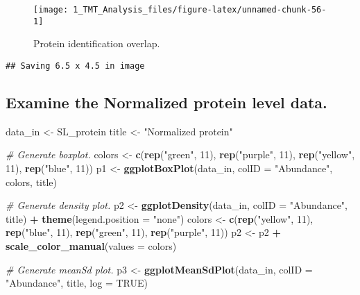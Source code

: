 \documentclass[]{article}
\newenvironment{Shaded}{\begin{snugshade}}{\end{snugshade}}
\newcommand{\KeywordTok}[1]{\textcolor[rgb]{0.13,0.29,0.53}{\textbf{#1}}}
\newcommand{\DataTypeTok}[1]{\textcolor[rgb]{0.13,0.29,0.53}{#1}}
\newcommand{\DecValTok}[1]{\textcolor[rgb]{0.00,0.00,0.81}{#1}}
\newcommand{\StringTok}[1]{\textcolor[rgb]{0.31,0.60,0.02}{#1}}
\newcommand{\CommentTok}[1]{\textcolor[rgb]{0.56,0.35,0.01}{\textit{#1}}}
\newcommand{\OtherTok}[1]{\textcolor[rgb]{0.56,0.35,0.01}{#1}}
\newcommand{\OperatorTok}[1]{\textcolor[rgb]{0.81,0.36,0.00}{\textbf{#1}}}
\newcommand{\NormalTok}[1]{#1}
\begin{document}
\begin{figure}

{\centering \texttt{[image: 1\_TMT\_Analysis\_files/figure-latex/unnamed-chunk-56-1]} 

}

\caption{Protein identification overlap.}\label{fig:unnamed-chunk-56}
\end{figure}

\begin{verbatim}
## Saving 6.5 x 4.5 in image
\end{verbatim}

\subsection{Examine the Normalized protein level
data.}\label{examine-the-normalized-protein-level-data.}

\begin{Shaded}
\begin{Highlighting}[]
\NormalTok{data_in <-}\StringTok{ }\NormalTok{SL_protein}
\NormalTok{title <-}\StringTok{ "Normalized protein"}

\CommentTok{# Generate boxplot.}
\NormalTok{colors <-}\StringTok{ }\KeywordTok{c}\NormalTok{(}\KeywordTok{rep}\NormalTok{(}\StringTok{"green"}\NormalTok{, }\DecValTok{11}\NormalTok{), }\KeywordTok{rep}\NormalTok{(}\StringTok{"purple"}\NormalTok{, }\DecValTok{11}\NormalTok{), }\KeywordTok{rep}\NormalTok{(}\StringTok{"yellow"}\NormalTok{, }\DecValTok{11}\NormalTok{), }\KeywordTok{rep}\NormalTok{(}\StringTok{"blue"}\NormalTok{, }\DecValTok{11}\NormalTok{))}
\NormalTok{p1 <-}\StringTok{ }\KeywordTok{ggplotBoxPlot}\NormalTok{(data_in, }\DataTypeTok{colID =} \StringTok{"Abundance"}\NormalTok{, colors, title)}

\CommentTok{# Generate density plot.}
\NormalTok{p2 <-}\StringTok{ }\KeywordTok{ggplotDensity}\NormalTok{(data_in, }\DataTypeTok{colID =} \StringTok{"Abundance"}\NormalTok{, title) }\OperatorTok{+}\StringTok{ }\KeywordTok{theme}\NormalTok{(}\DataTypeTok{legend.position =} \StringTok{"none"}\NormalTok{)}
\NormalTok{colors <-}\StringTok{ }\KeywordTok{c}\NormalTok{(}\KeywordTok{rep}\NormalTok{(}\StringTok{"yellow"}\NormalTok{, }\DecValTok{11}\NormalTok{), }\KeywordTok{rep}\NormalTok{(}\StringTok{"blue"}\NormalTok{, }\DecValTok{11}\NormalTok{), }\KeywordTok{rep}\NormalTok{(}\StringTok{"green"}\NormalTok{, }\DecValTok{11}\NormalTok{), }\KeywordTok{rep}\NormalTok{(}\StringTok{"purple"}\NormalTok{, }\DecValTok{11}\NormalTok{))}
\NormalTok{p2 <-}\StringTok{ }\NormalTok{p2 }\OperatorTok{+}\StringTok{ }\KeywordTok{scale_color_manual}\NormalTok{(}\DataTypeTok{values =}\NormalTok{ colors)}

\CommentTok{# Generate meanSd plot.}
\NormalTok{p3 <-}\StringTok{ }\KeywordTok{ggplotMeanSdPlot}\NormalTok{(data_in, }\DataTypeTok{colID =} \StringTok{"Abundance"}\NormalTok{, title, }\DataTypeTok{log =} \OtherTok{TRUE}\NormalTok{)}
\end{Highlighting}
\end{Shaded}
\end{document}
